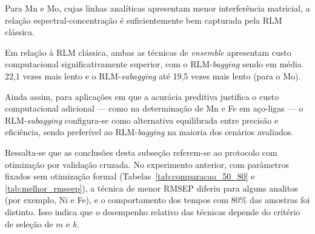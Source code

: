 Para Mn e Mo, cujas linhas 
analíticas apresentam menor interferência matricial, a relação 
espectral-concentração é suficientemente bem capturada pela RLM clássica.

Em relação à RLM clássica, ambas as técnicas de
\textit{ensemble} apresentam custo computacional significativamente
superior, com o RLM-\textit{bagging} sendo em média 22,1 vezes
mais lento e o RLM-\textit{subagging} até 19,5 vezes mais lento
(para o Mo).

Ainda assim, para aplicações em que a acurácia
preditiva justifica o custo computacional adicional --- como na
determinação de Mn e Fe em aço-ligas --- o
RLM-\textit{subagging} configura-se como alternativa equilibrada
entre precisão e eficiência, sendo preferível ao
RLM-\textit{bagging} na maioria dos cenários avaliados.


Ressalta-se que as conclusões desta subseção referem-se ao protocolo com
otimização por validação cruzada. No experimento anterior, com parâmetros
fixados sem otimização formal (Tabelas~\ref{tab:comparacao_50_80} e
\ref{tab:melhor_rmseep}), a técnica de menor RMSEP diferiu para alguns
analitos (por exemplo, Ni e Fe), e o comportamento dos tempos com 80\% das
amostras foi distinto. Isso indica que o desempenho relativo das técnicas
depende do critério de seleção de $m$ e $k$.









